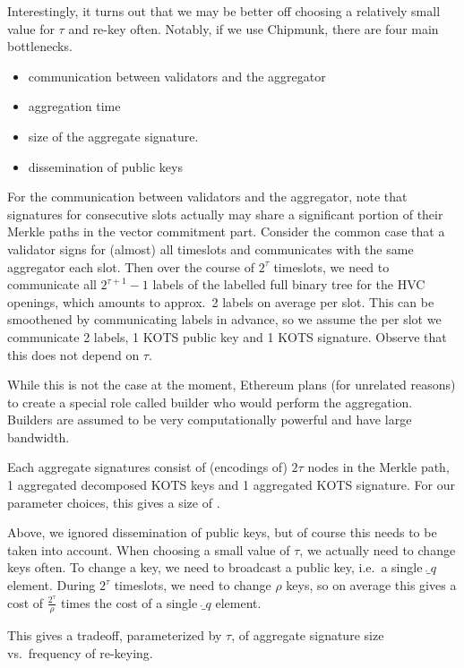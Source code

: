 Interestingly, it turns out that we may be better off choosing a relatively small value for $\tau$ and re-key often. Notably, if we use Chipmunk, there are four main bottlenecks.
\begin{itemize}
\item communication between validators and the aggregator
\item aggregation time
\item size of the aggregate signature.
\item dissemination of public keys
\end{itemize}
For the communication between validators and the aggregator, note that signatures for consecutive slots actually may share a significant portion of their Merkle paths in the vector commitment part.
Consider the common case that a validator signs for (almost) all timeslots and communicates with the same aggregator each slot.
Then over the course of $2^\tau$ timeslots, we need to communicate all $2^{\tau+1} - 1$ labels of the labelled full binary tree for the HVC openings, which amounts to approx.\ 2 labels on average per slot.
This can be smoothened by communicating labels in advance, so we assume the per slot we communicate 2 labels, 1 KOTS public key and 1 KOTS signature.
Observe that this does not depend on $\tau$.

While this is not the case at the moment, Ethereum plans (for unrelated reasons) to create a special role called builder who would perform the aggregation. Builders are assumed to be very computationally powerful and have large bandwidth.

Each aggregate signatures consist of (encodings of) $2\tau$ nodes in the Merkle path, 1 aggregated decomposed KOTS keys and 1 aggregated KOTS signature.
For our parameter choices, this gives a size of .

\bigskip
Above, we ignored dissemination of public keys, but of course this needs to be taken into account.
When choosing a small value of $\tau$, we actually need to change keys often.
To change a key, we need to broadcast a public key, i.e.\ a single $\ring_q$ element.
During $2^\tau$ timeslots, we need to change $\rho$ keys, so on average this gives a cost of $\frac{2^\tau}{\rho}$ times the cost of a single $\ring_q$ element.

This gives a tradeoff, parameterized by $\tau$, of aggregate signature size vs.\ frequency of re-keying.

